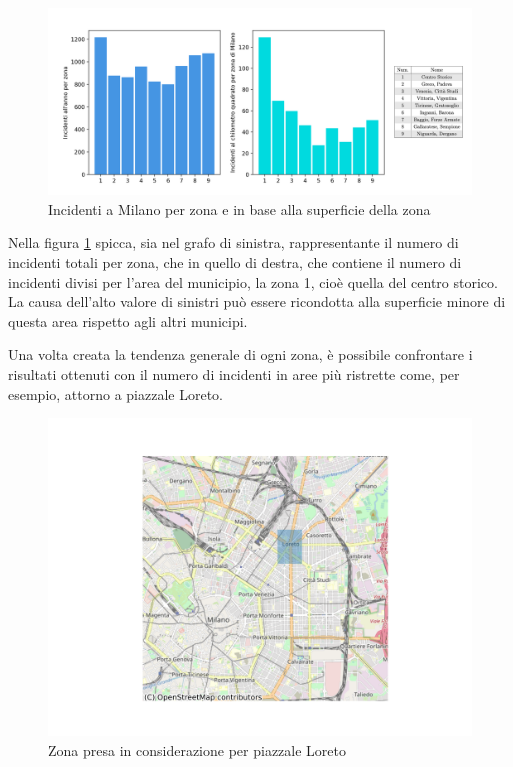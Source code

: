 \documentclass[a4paper,12pt]{report}
\begin{document}
\begin{figure}
    \includegraphics[width=\linewidth]{../src/municipi_milano/incidenti_superf.png}
    \caption{Incidenti a Milano per zona e in base alla superficie della zona}
    \label{fig:incidenti-chilometro}
\end{figure}

Nella figura \ref{fig:incidenti-chilometro} spicca, sia nel grafo di sinistra, rappresentante 
il numero di incidenti totali per zona, che in 
quello di destra, che contiene il numero di incidenti divisi per l'area del municipio, 
la zona 1, cioè quella del centro storico. 
La causa dell'alto valore di sinistri può essere ricondotta alla superficie minore 
di questa area rispetto agli altri municipi. 

Una volta creata la tendenza generale di ogni zona, è possibile confrontare i risultati 
ottenuti con il numero di incidenti in aree più ristrette come, per esempio, 
attorno a piazzale Loreto. 

\begin{figure}
    \hfill\includegraphics[width=0.7\linewidth]{../src/municipi_milano/zona_loreto.png}\hspace*{\fill}
    \caption{Zona presa in considerazione per piazzale Loreto}
    \label{fig:zona-loreto}
\end{figure}
\end{document}

